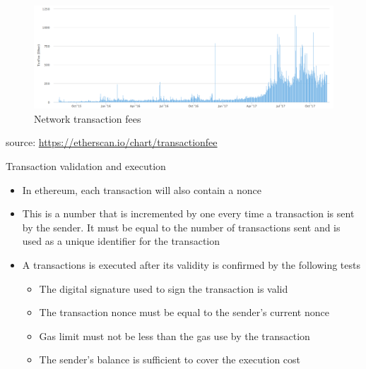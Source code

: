 \documentclass[9pt]{beamer}
\begin{document}

\begin{frame}
	\begin{figure}[]
		\centering
		\includegraphics  [scale=0.25]{Images/eth-fee}
		\caption{Network transaction fees}
	\end{figure}
	\begin{scriptsize}
		source: \href{https://etherscan.io/chart/transactionfee}{https://etherscan.io/chart/transactionfee}
	\end{scriptsize}
\end{frame}


\begin{frame}{Transaction validation and execution}
	\begin{itemize}
		\item In ethereum, each transaction will also contain a nonce
		\item This is a number that is incremented by one every time a transaction is sent by the sender. It must be equal to the number of transactions sent and is used as a unique identifier for the transaction
		\item A transactions is executed after its validity is confirmed by the following tests
		\begin{itemize}
			\item The digital signature used to sign the transaction is valid
			\item The transaction nonce must be equal to the sender's current nonce
			\item Gas limit must not be less than the gas use by the transaction
			\item The sender's balance is sufficient to cover the execution cost
		\end{itemize}
	\end{itemize}
\end{frame}
\end{document}
